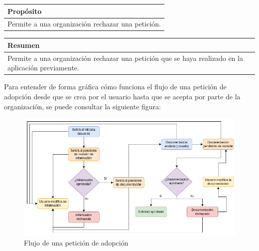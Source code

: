 \begin{table}[H]
    \centering
    \begin{tabularx}{\textwidth}{@{} |L |@{}} \hline
        \textbf{Propósito} \\
        \hline
        Permite a una organización rechazar una petición. \\
        \hline
    \end{tabularx}
\end{table}

\begin{table}[H]
    \centering
    \begin{tabularx}{\textwidth}{@{} |L |@{}} \hline
        \textbf{Resumen} \\
        \hline
        Permite a una organización rechazar una petición que se haya realizado en la aplicación previamente. \\
        \hline
    \end{tabularx}
\end{table}

Para entender de forma gráfica cómo funciona el flujo de una petición de adopción desde que se crea por el usuario hasta que se acepta
por parte de la organización, se puede consultar la siguiente figura: \\

\begin{figure}[H]
    \centering
    \includegraphics[width=1.0\textwidth]{imgs/estados-peticion.png}
    \caption{Flujo de una petición de adopción}
    \label{fig:flujo-peticion}
\end{figure}